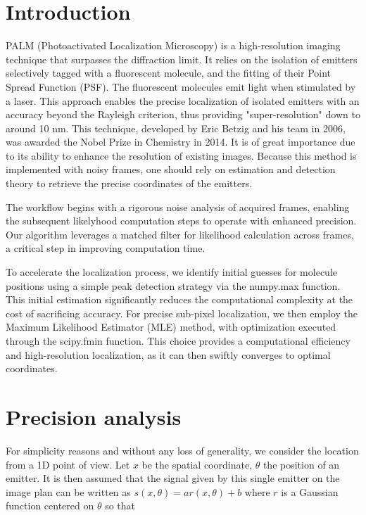 \documentclass[10pt,letterpaper]{article}
\begin{document}
\section{Introduction}
PALM (Photoactivated Localization Microscopy) is a high-resolution imaging technique that surpasses the diffraction limit. It relies on the isolation of emitters selectively tagged with a fluorescent molecule, and the fitting of their Point Spread Function (PSF). The fluorescent molecules emit light when stimulated by a laser. This approach enables the precise localization of isolated emitters with an accuracy beyond the Rayleigh criterion, thus providing "super-resolution" down to around 10 nm. This technique, developed by Eric Betzig and his team in 2006, was awarded the Nobel Prize in Chemistry in 2014. It is of great importance due to its ability to enhance the resolution of existing images. Because this method is implemented with noisy frames, one should rely on estimation and detection theory to retrieve the precise coordinates of the emitters.

The workflow begins with a rigorous noise analysis of acquired frames, enabling the subsequent likelyhood computation steps to operate with enhanced precision. Our algorithm leverages a matched filter for likelihood calculation across frames, a critical step in improving computation time.

To accelerate the localization process, we identify initial guesses for molecule positions using a simple peak detection strategy via the numpy.max function. This initial estimation significantly reduces the computational complexity at the cost of sacrificing accuracy. For precise sub-pixel localization, we then employ the Maximum Likelihood Estimator (MLE) method, with optimization executed through the scipy.fmin function. This choice provides a computational efficiency and high-resolution localization, as it can then swiftly converges to optimal coordinates.

\section{Precision analysis}

For simplicity reasons and without any loss of generality, we consider the location from a 1D point of view. Let $x$ be the spatial coordinate, $\theta$ the position of an emitter. It is then assumed that the signal given by this single emitter on the image plan can be written as $s(x, \theta)=a r(x, \theta)+b$ where $r$ is a Gaussian function centered on $\theta$ so that
\end{document}
